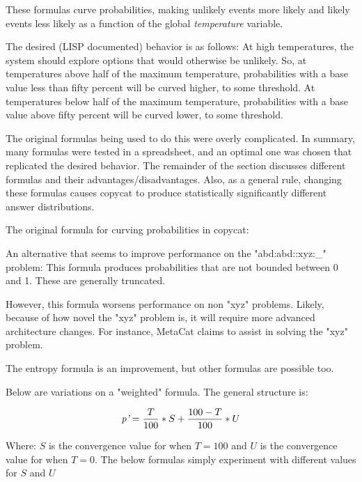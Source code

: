 \documentclass[a4paper]{article}
\begin{document}
        These formulas curve probabilities, making unlikely events more likely and likely events less likely as a function of the global \emph{temperature} variable.

        The desired (LISP documented) behavior is as follows:
        At high temperatures, the system should explore options that would otherwise be unlikely.
        So, at temperatures above half of the maximum temperature, probabilities with a base value less than fifty percent will be curved higher, to some threshold.
        At temperatures below half of the maximum temperature, probabilities with a base value above fifty percent will be curved lower, to some threshold.

        The original formulas being used to do this were overly complicated.
        In summary, many formulas were tested in a spreadsheet, and an optimal one was chosen that replicated the desired behavior.
        The remainder of the section discusses different formulas and their advantages/disadvantages.
        Also, as a general rule, changing these formulas causes copycat to produce statistically significantly different answer distributions.

        The original formula for curving probabilities in copycat:
        

        An alternative that seems to improve performance on the "abd:abd::xyz:\_" problem:
        This formula produces probabilities that are not bounded between 0 and 1. These are generally truncated.
        

        However, this formula worsens performance on non "xyz" problems.
        Likely, because of how novel the "xyz" problem is, it will require more advanced architecture changes.
        For instance, MetaCat claims to assist in solving the "xyz" problem.

        The entropy formula is an improvement, but other formulas are possible too.

        Below are variations on a "weighted" formula.
        The general structure is:

        \[\emph{p'} = \frac{T}{100} * S + \frac{100-T}{100} * U\]

        Where: $S$ is the convergence value for when $T = 100$ and
               $U$ is the convergence value for when $T = 0$.
        The below formulas simply experiment with different values for $S$ and $U$
\end{document}
